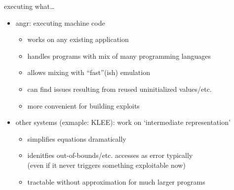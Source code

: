 \begin{frame}{executing what\ldots}
    \begin{itemize}
    \item angr: executing machine code
        \begin{itemize}
        \item works on any existing application
        \item handles programs with mix of many programming languages
        \item allows mixing with ``fast''(ish) emulation
        \item can find issues resulting from reused uninitialized values/etc.
        \item more convenient for building exploits
        \end{itemize}
    \item other systems (exmaple: KLEE): work on `intermediate representation'
        \begin{itemize}
        \item simplifies equations dramatically
        \item idenitfies out-of-bounds/etc. accesses as error typically \\
        (even if it never triggers something exploitable now)
        \item tractable without approximation for much larger programs
        \end{itemize}
    \end{itemize}
\end{frame}
